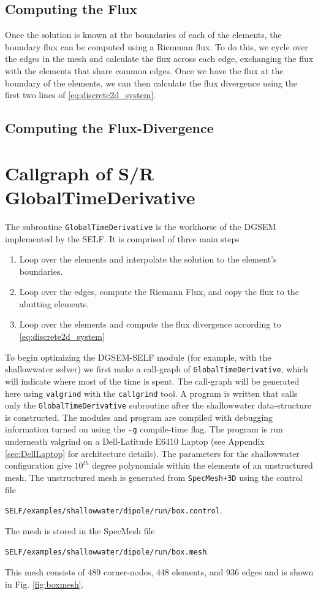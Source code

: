 \documentclass{softwaremanual}
\begin{document}
\subsection{Computing the Flux}
Once the solution is known at the boundaries of each of the elements, the boundary flux can be computed using a Riemman flux. To do this, we cycle over the edges in the mesh and calculate the flux across each edge, exchanging the flux with the elements that share common edges. Once we have the flux at the boundary of the elements, we can then calculate the flux divergence using the first two lines of \eqref{eq:discrete2d_system}.


\subsection{Computing the Flux-Divergence}\label{sec:MappedTimeDerivative}

\section{Callgraph of S/R GlobalTimeDerivative}
The subroutine \texttt{GlobalTimeDerivative} is the workhorse of the DGSEM implemented by the SELF. It is comprised of three main steps
\begin{enumerate}
\item Loop over the elements and interpolate the solution to the element's boundaries.
\item Loop over the edges, compute the Riemann Flux, and copy the flux to the abutting elements.
\item Loop over the elements and compute the flux divergence according to \eqref{eq:discrete2d_system}
\end{enumerate}

To begin optimizing the DGSEM-SELF module (for example, with the shallowwater solver) we first make a call-graph of \texttt{GlobalTimeDerivative}, which will indicate where most of the time is spent. The call-graph will be generated here using \texttt{valgrind} with the \texttt{callgrind} tool. A program is written that calls only the \texttt{GlobalTimeDerivative} subroutine after the shallowwater data-structure is constructed. The modules and program are compiled with debugging information turned on using the \texttt{-g} compile-time flag. The program is run underneath valgrind on a Dell-Latitude E6410 Laptop (see Appendix \ref{sec:DellLaptop} for architecture details). The parameters for the shallowwater configuration give $10^{th}$ degree polynomials within the elements of an unstructured mesh. The unstructured mesh is generated from \texttt{SpecMesh+3D} using the control file
\begin{center} \texttt{SELF/examples/shallowwater/dipole/run/box.control}. 
\end{center}
The mesh is stored in the SpecMesh file 
\begin{center}
\texttt{SELF/examples/shallowwater/dipole/run/box.mesh}.
\end{center}
This mesh consists of  489 corner-nodes, 448 elements, and 936 edges and is shown in Fig. \ref{fig:boxmesh}.
\end{document}
